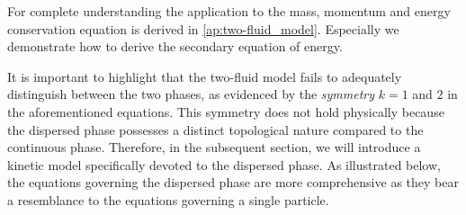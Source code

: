 For complete understanding the application to the mass, momentum and energy conservation equation is derived in \ref{ap:two-fluid_model}. 
Especially we demonstrate how to derive the secondary equation of energy. 

It is important to highlight that the two-fluid model fails to adequately distinguish between the two phases, as evidenced by the \textit{symmetry} $k = 1$ and $2$ in the aforementioned equations. This symmetry does not hold physically because the dispersed phase possesses a distinct topological nature compared to the continuous phase. Therefore, in the subsequent section, we will introduce a kinetic model specifically devoted to the dispersed phase. As illustrated below, the equations governing the dispersed phase are more comprehensive as they bear a resemblance to the equations governing a single particle.



